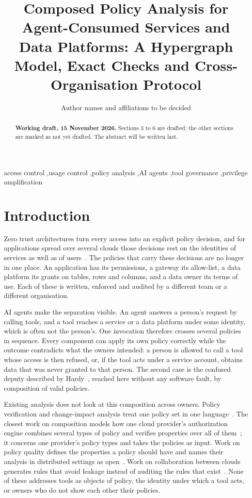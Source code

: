 \documentclass[preprint,12pt]{elsarticle}
\theoremstyle{definition}
\theoremstyle{remark}
\begin{document}
\begin{frontmatter}
\title{Composed Policy Analysis for Agent-Consumed Services and Data Platforms: A Hypergraph Model, Exact Checks and Cross-Organisation Protocol}
\author{Author names and affiliations to be decided}

\begin{abstract}
\textbf{Working draft, 15 November 2026.} Sections 3 to 6 are drafted; the other sections are marked as not yet drafted. The abstract will be written last.
\end{abstract}
\begin{keyword}
access control \sep usage control \sep policy analysis \sep AI agents \sep tool governance \sep privilege amplification
\end{keyword}
\end{frontmatter}

\section{Introduction}
Zero trust architectures turn every access into an explicit policy decision, and for applications spread over several clouds those decisions rest on the identities of services as well as of users~\cite{nist800207a}. The policies that carry these decisions are no longer in one place. An application has its permissions, a gateway its allow-list, a data platform its grants on tables, rows and columns, and a data owner its terms of use. Each of these is written, enforced and audited by a different team or a different organisation.

AI agents make the separation visible. An agent answers a person's request by calling tools, and a tool reaches a service or a data platform under some identity, which is often not the person's. One invocation therefore crosses several policies in sequence. Every component can apply its own policy correctly while the outcome contradicts what the owners intended: a person is allowed to call a tool whose access is then refused, or, if the tool acts under a service account, obtains data that was never granted to that person. The second case is the confused deputy described by Hardy~\cite{hardy1988deputy}, reached here without any software fault, by composition of valid policies.

Existing analysis does not look at this composition across owners. Policy verification and change-impact analysis treat one policy set in one language~\cite{fisler2005margrave,backes2018zelkova}. The closest work on composition models how one cloud provider's authorization engine combines several types of policy and verifies properties over all of them~\cite{barnett2025authz}; it concerns one provider's policy types and takes the policies as input. Work on policy quality defines the properties a policy should have and names their analysis in distributed settings as open~\cite{bertino2018quality}. Work on collaboration between clouds generates rules that avoid leakage instead of auditing the rules that exist~\cite{john2026multicloud}. None of these addresses tools as objects of policy, the identity under which a tool acts, or owners who do not show each other their policies.
\end{document}
